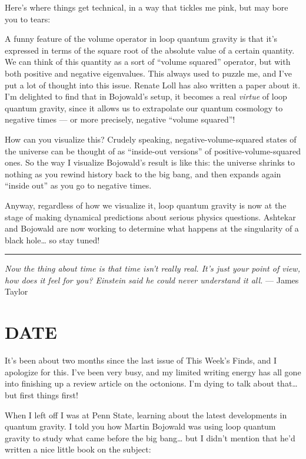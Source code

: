 \documentclass{article}
\begin{document}
Here's where things get technical, in a way that tickles me pink, but
may bore you to tears:

A funny feature of the volume operator in loop quantum gravity is that
it's expressed in terms of the square root of the absolute value of a
certain quantity. We can think of this quantity as a sort of ``volume
squared'' operator, but with both positive and negative eigenvalues.
This always used to puzzle me, and I've put a lot of thought into this
issue. Renate Loll has also written a paper about it. I'm delighted to
find that in Bojowald's setup, it becomes a real \emph{virtue} of loop
quantum gravity, since it allows us to extrapolate our quantum cosmology
to negative times --- or more precisely, negative ``volume squared''!

How can you visualize this? Crudely speaking, negative-volume-squared
states of the universe can be thought of as ``inside-out versions'' of
positive-volume-squared ones. So the way I visualize Bojowald's result
is like this: the universe shrinks to nothing as you rewind history back
to the big bang, and then expands again ``inside out'' as you go to
negative times.

Anyway, regardless of how we visualize it, loop quantum gravity is now
at the stage of making dynamical predictions about serious physics
questions. Ashtekar and Bojowald are now working to determine what
happens at the singularity of a black hole\ldots{} so stay tuned!

\begin{center}\rule{0.5\linewidth}{0.5pt}\end{center}

\emph{Now the thing about time is that time isn't really real. It's just
your point of view, how does it feel for you? Einstein said he could
never understand it all.} --- James Taylor
\hypertarget{week168}{%
\section{DATE}\label{week168}}

It's been about two months since the last issue of This Week's Finds,
and I apologize for this. I've been very busy, and my limited writing
energy has all gone into finishing up a review article on the octonions.
I'm dying to talk about that\ldots{} but first things first!

When I left off I was at Penn State, learning about the latest
developments in quantum gravity. I told you how Martin Bojowald was
using loop quantum gravity to study what came before the big
bang\ldots{} but I didn't mention that he'd written a nice little book
on the subject:
\end{document}
